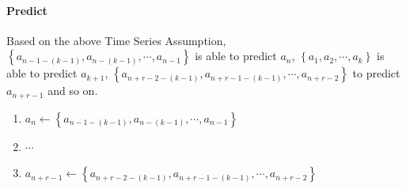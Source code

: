 \documentclass[a0,portrait]{a0poster}
\begin{document}
\begin{multicols}{3}
\paragraph*{Predict}
Based on the above Time Series Assumption, $\left\{a_{n - 1 - \left(k - 1\right)}, a_{n - \left(k - 1\right)}, \cdots, a_{n - 1}\right\}$ is able to predict $a_{n}$, $\left\{a_1, a_2, \cdots, a_{k}\right\}$ is able to predict $a_{k + 1}$, $\left\{a_{n + r - 2 - \left(k - 1\right)}, a_{n + r - 1 - \left(k - 1\right)}, \cdots, a_{n + r - 2}\right\}$ to predict $a_{n + r - 1}$ and so on.
\begin{enumerate}
\item $a_{n} \gets \left\{a_{n - 1 - \left(k - 1\right)}, a_{n - \left(k - 1\right)}, \cdots, a_{n - 1}\right\}$
\item $\cdots$
\item $a_{n + r - 1} \gets \left\{a_{n + r - 2 - \left(k - 1\right)}, a_{n + r - 1 - \left(k - 1\right)}, \cdots, a_{n + r - 2}\right\}$
\end{enumerate}

\end{multicols}
\end{document}
